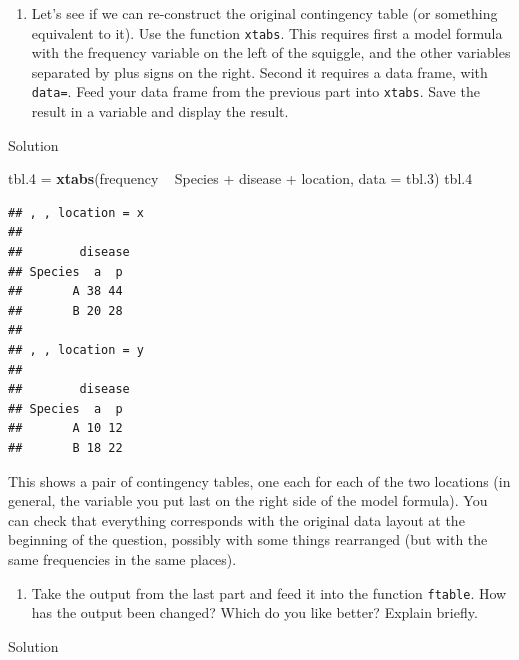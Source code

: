 \documentclass[]{tufte-book}
\newenvironment{Shaded}{}{}
\newcommand{\DataTypeTok}[1]{\textcolor[rgb]{0.56,0.13,0.00}{#1}}
\newcommand{\FloatTok}[1]{\textcolor[rgb]{0.25,0.63,0.44}{#1}}
\newcommand{\KeywordTok}[1]{\textcolor[rgb]{0.00,0.44,0.13}{\textbf{#1}}}
\newcommand{\NormalTok}[1]{#1}
\newcommand{\OperatorTok}[1]{\textcolor[rgb]{0.40,0.40,0.40}{#1}}
\newcommand{\StringTok}[1]{\textcolor[rgb]{0.25,0.44,0.63}{#1}}
\providecommand{\tightlist}{%
  \setlength{\itemsep}{0pt}\setlength{\parskip}{0pt}}
\theoremstyle{definition}
\theoremstyle{definition}
\theoremstyle{definition}
\theoremstyle{remark}
\begin{document}
\begin{enumerate}
\def\labelenumi{(\alph{enumi})}
\setcounter{enumi}{5}
\tightlist
\item
  Let's see if we can re-construct the original contingency table (or
  something equivalent to it). Use the function \texttt{xtabs}. This
  requires first a model formula with the frequency variable on the left
  of the squiggle, and the other variables separated by plus signs on
  the right. Second it requires a data frame, with \texttt{data=}. Feed
  your data frame from the previous part into \texttt{xtabs}. Save the
  result in a variable and display the result.
\end{enumerate}

Solution

\begin{Shaded}
\begin{Highlighting}[]
\NormalTok{tbl}\FloatTok{.4}\NormalTok{ =}\StringTok{ }\KeywordTok{xtabs}\NormalTok{(frequency }\OperatorTok{~}\StringTok{ }\NormalTok{Species }\OperatorTok{+}\StringTok{ }\NormalTok{disease }\OperatorTok{+}\StringTok{ }
\StringTok{    }\NormalTok{location, }\DataTypeTok{data =}\NormalTok{ tbl}\FloatTok{.3}\NormalTok{)}
\NormalTok{tbl}\FloatTok{.4}
\end{Highlighting}
\end{Shaded}

\begin{verbatim}
## , , location = x
## 
##        disease
## Species  a  p
##       A 38 44
##       B 20 28
## 
## , , location = y
## 
##        disease
## Species  a  p
##       A 10 12
##       B 18 22
\end{verbatim}

This shows a pair of contingency tables, one each for each of the two
locations (in general, the variable you put last on the right side of
the model formula). You can check that everything corresponds with the
original data layout at the beginning of the question, possibly with
some things rearranged (but with the same frequencies in the same
places).

\begin{enumerate}
\def\labelenumi{(\alph{enumi})}
\setcounter{enumi}{6}
\tightlist
\item
  Take the output from the last part and feed it into the function
  \texttt{ftable}. How has the output been changed? Which do you like
  better? Explain briefly.
\end{enumerate}

Solution
\end{document}
